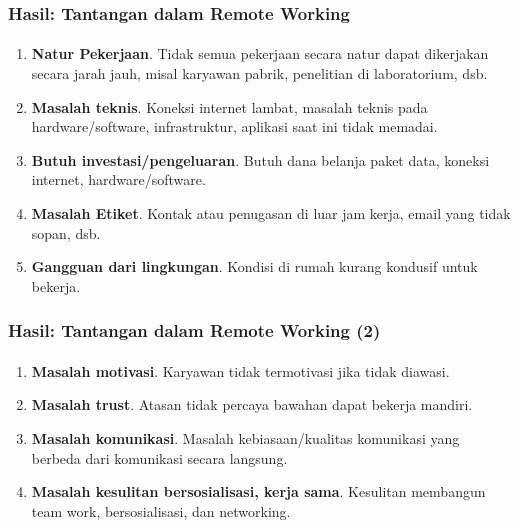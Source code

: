 \documentclass[aspectratio=169, table]{beamer}
\begin{document}
	\begin{frame}
		\frametitle{Hasil: Tantangan dalam Remote Working}
		\framesubtitle{\hspace{1cm}}
		\begin{enumerate}
			\item \textbf{Natur Pekerjaan}. Tidak semua pekerjaan secara natur dapat dikerjakan secara jarah jauh, misal karyawan pabrik, penelitian di laboratorium, dsb.
			\item \textbf{Masalah teknis}. Koneksi internet lambat, masalah teknis pada hardware/software, infrastruktur, aplikasi saat ini tidak memadai.
			\item \textbf{Butuh investasi/pengeluaran}. Butuh dana belanja paket data, koneksi internet, hardware/software.
			\item \textbf{Masalah Etiket}. Kontak atau penugasan di luar jam kerja, email yang tidak sopan, dsb.
			\item \textbf{Gangguan dari lingkungan}. Kondisi di rumah kurang kondusif untuk bekerja.

		\end{enumerate}
	\end{frame}

	\begin{frame}
		\frametitle{Hasil: Tantangan dalam Remote Working (2)}
		\framesubtitle{\hspace{1cm}}
		\begin{enumerate}

			\item \textbf{Masalah motivasi}. Karyawan tidak termotivasi jika tidak diawasi.
			\item \textbf{Masalah trust}. Atasan tidak percaya bawahan dapat bekerja mandiri.
			\item \textbf{Masalah komunikasi}. Masalah  kebiasaan/kualitas komunikasi yang berbeda dari komunikasi secara langsung.
			\item \textbf{Masalah kesulitan bersosialisasi, kerja sama}. Kesulitan membangun team work, bersosialisasi, dan networking.
		\end{enumerate}
	\end{frame}
\end{document}
